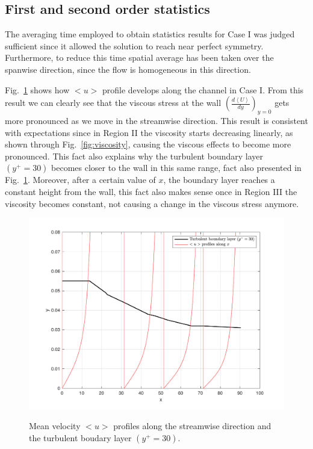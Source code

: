 \documentclass[twocolumn,10pt]{asme2e}
\begin{document}
\subsection*{First and second order statistics}

The averaging time employed to obtain statistics results for Case I was judged sufficient since it allowed the solution to reach near perfect symmetry. Furthermore, to reduce this time spatial average has been taken over the spanwise direction, since the flow is homogeneous in this direction.

Fig.~\ref{fig:u_CI}  shows how \(<u>\) profile develops along the channel in Case I. From this result we can clearly see that the viscous stress at the wall \(\left(\frac{d\left<U\right>}{dy}\right)_{y=0}\) gets more pronounced as we move in the streamwise direction. This result is consistent with expectations since in Region II the viscosity starts decreasing linearly, as shown through Fig.~\ref{fig:viscosity}, causing the viscous effects to become more pronounced. This fact also explains why the turbulent boundary layer \((y^+=30)\) becomes closer to the wall in this same range, fact also presented in Fig.~\ref{fig:u_CI}. Moreover, after a certain value of \(x\), the boundary layer reaches a constant height from the wall, this fact also makes sense once in Region III the viscosity becomes constant, not causing a change in the viscous stress anymore.

\begin{figure}[t]
\centering
\scalebox{0.5}
{\includegraphics{u_CI.pdf}}
\caption{Mean velocity \(<u>\) profiles along the streamwise direction and the turbulent boudary layer \((y^+=30)\).}
\label{fig:u_CI}
\end{figure}
\end{document}
